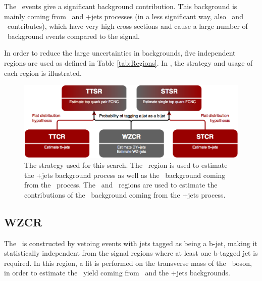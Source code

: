 The \NPL\  events give a significant background contribution. This background is mainly coming from \DY\ and \ttbar+jets processes (in a less significant way, also \WW\ and \tWZ\ contributes), which have very high cross sections and cause a large number of \NPL\  background events compared to the signal.

In order to reduce the large uncertainties in backgrounds, five independent regions are used as defined in Table  \ref{tab:Regions}. In , the strategy and usage of each region is illustrated.
\begin{figure}
	\centering
	\includegraphics[width=1.\linewidth]{5_EventSelection/Figures/regions}
	\caption{The strategy used for this search. The \WZCR\ region is used to estimate the \WZ+jets background process as well as the \NPL\ background coming from the \DY\ process. The \TTCR\ and \STCR\ regions are used to estimate the contributions of the \NPL\ background coming from the \ttbar+jets process.}
	\label{fig:regions}
\end{figure}


\subsection{WZCR}
The \WZCR\ is constructed by vetoing events with jets tagged as being a b-jet, making it statistically independent from the signal regions where at least one b-tagged jet is required. In this region, a fit is performed on the transverse mass of the \PW\ boson, in order to estimate the \NPL\ yield coming from \DY\ and the \WZ+jets backgrounds. 

